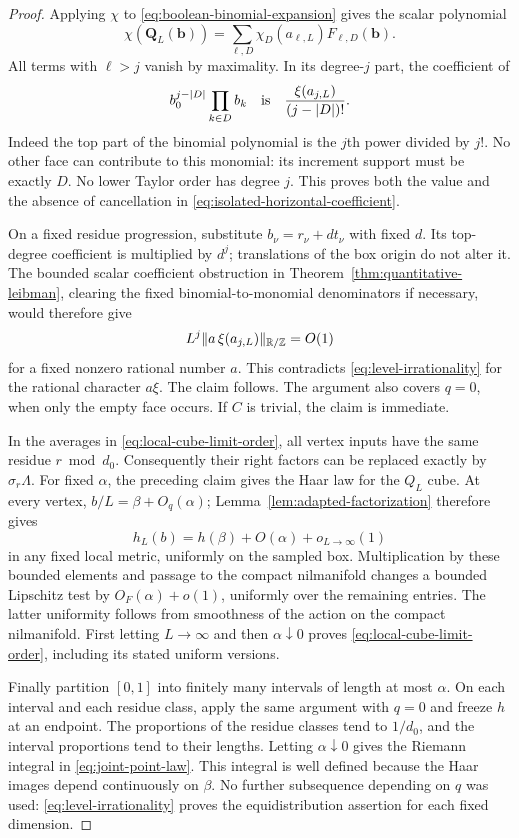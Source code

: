 \begin{proof}
Applying $\chi$ to \eqref{eq:boolean-binomial-expansion} gives the
scalar polynomial
\[
 \chi(\mathbf Q_L(\mathbf b))
 =\sum_{\ell,D}\chi_D(a_{\ell,L})F_{\ell,D}(\mathbf b).
\]
All terms with $\ell>j$ vanish by maximality.  In its degree-$j$ part,
the coefficient of
\begin{equation}
 b_0^{j-|D|}\prod_{k\in D}b_k
 \quad\hbox{is}\quad
 \frac{\xi(a_{j,L})}{(j-|D|)!}.
 \label{eq:isolated-horizontal-coefficient}
\end{equation}
Indeed the top part of the binomial polynomial is the $j$th power
divided by $j!$.  No other face can contribute to this monomial: its
increment support must be exactly $D$.  No lower Taylor order has
degree $j$.  This proves both the value and the absence of cancellation
in \eqref{eq:isolated-horizontal-coefficient}.

On a fixed residue progression, substitute
$b_\nu=r_\nu+d t_\nu$ with fixed $d$.  Its top-degree coefficient is
multiplied by $d^j$; translations of the box origin do not alter it.
The bounded scalar coefficient obstruction in
Theorem~\ref{thm:quantitative-leibman}, clearing the fixed
binomial-to-monomial denominators if necessary, would therefore give
\[
 L^j\lVert a\,\xi(a_{j,L})\rVert_{\mathbb R/\mathbb Z}=O(1)
\]
for a fixed nonzero rational number $a$.  This contradicts
\eqref{eq:level-irrationality} for the rational character $a\xi$.
The claim follows.  The argument also covers $q=0$, when only the
empty face occurs.  If $C$ is trivial, the claim is immediate.

In the averages in \eqref{eq:local-cube-limit-order}, all vertex inputs
have the same residue $r\bmod d_0$.  Consequently their right factors
can be replaced exactly by $\sigma_r\Lambda$.  For fixed $\alpha$,
the preceding claim gives the Haar law for the $Q_L$ cube.  At every
vertex, $b/L=\beta+O_q(\alpha)$; Lemma~\ref{lem:adapted-factorization}
therefore gives
\[
 h_L(b)=h(\beta)+O(\alpha)+o_{L\to\infty}(1)
\]
in any fixed local metric, uniformly on the sampled box.  Multiplication
by these bounded elements and passage to the compact nilmanifold changes
a bounded Lipschitz test by $O_F(\alpha)+o(1)$, uniformly over the
remaining entries.  The latter uniformity follows from smoothness of
the action on the compact nilmanifold.  First letting $L\to\infty$
and then $\alpha\downarrow0$ proves
\eqref{eq:local-cube-limit-order}, including its stated uniform versions.

Finally partition $[0,1]$ into finitely many intervals of length at most
$\alpha$.  On each interval and each residue class, apply the same
argument with $q=0$ and freeze $h$ at an endpoint.  The proportions of
the residue classes tend to $1/d_0$, and the interval proportions tend
to their lengths.  Letting $\alpha\downarrow0$ gives the Riemann integral
in \eqref{eq:joint-point-law}.  This integral is well defined because
the Haar images depend continuously on $\beta$.  No further subsequence
depending on $q$ was used: \eqref{eq:level-irrationality} proves the
equidistribution assertion for each fixed dimension.
\end{proof}


